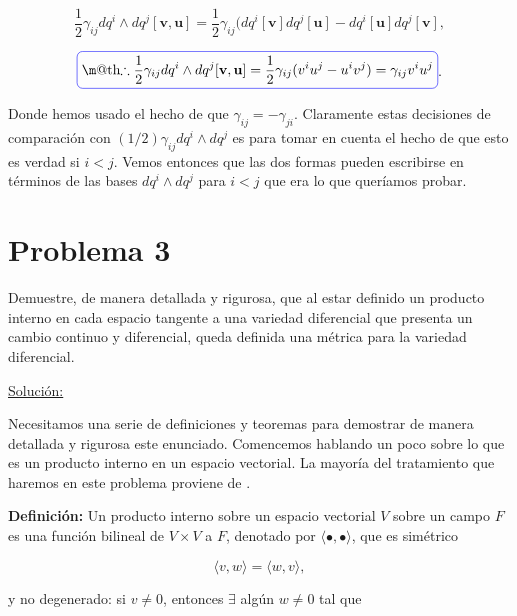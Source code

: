 \documentclass[a4paper,10pt]{article}
\makeatletter
\numberwithin{equation}{section}
\newcommand*{\boxcolor}{blue}
\renewcommand{\boxed}[1]{\textcolor{\boxcolor}{%
\tikz[baseline={([yshift=-1ex]current bounding box.center)}] \node [rectangle, minimum width=1ex,rounded corners,draw] {\normalcolor\m@th$\displaystyle#1$};}}
\newcommand{\definicion}{\textbf{Definición: }}
\makeatother
\begin{document}
\begin{equation}
 \frac{1}{2}\gamma_{ij} dq^i \wedge dq^j [\mathbf{v},\mathbf{u}] = 
 \frac{1}{2}\gamma_{ij}(dq^i[\mathbf{v}]dq^j[\mathbf{u}] - dq^i[\mathbf{u}]dq^j[\mathbf{v}],
\end{equation}

\begin{equation}
 \boxed{\therefore \frac{1}{2}\gamma_{ij} dq^i \wedge dq^j [\mathbf{v},\mathbf{u}] = 
 \frac{1}{2}\gamma_{ij}(v^iu^j - u^iv^j) = \gamma_{ij}v^iu^j}.
\end{equation}

Donde hemos usado el hecho de que $\gamma_{ij} = - \gamma_{ji}$. Claramente estas decisiones 
de comparación con $(1/2)\gamma_{ij}dq^i \wedge dq^j$ es para tomar en cuenta el hecho 
de que esto es verdad si $i < j$. Vemos entonces que las dos formas pueden escribirse 
en términos de las bases $dq^i \wedge dq^j$ para $i < j$ que era lo que queríamos probar.


\section{Problema 3}

Demuestre, de manera detallada y rigurosa, que al estar definido un producto interno 
en cada espacio tangente a una variedad diferencial que presenta un cambio continuo 
y diferencial, queda definida una métrica para la variedad diferencial.

\vspace{.3cm}

\underline{Solución:} \vspace{.3cm}

Necesitamos una serie de definiciones y teoremas para demostrar de manera detallada 
y rigurosa este enunciado. Comencemos hablando un poco sobre lo que es un producto 
interno en un espacio vectorial. La mayoría del tratamiento que haremos en este 
problema proviene de \cite{spivak}.

\vspace{.3cm}

\definicion Un producto interno sobre un espacio vectorial $V$ sobre un campo $F$ es 
una función bilineal de $V \times V$ a $F$, denotado por $\langle \bullet, \bullet \rangle$, que 
es simétrico

\begin{equation}
 \langle v, w \rangle = \langle w, v \rangle,
\end{equation}

y no degenerado: si $v\ne 0$, entonces $\exists$ algún $w \ne 0$ tal que
\end{document}
